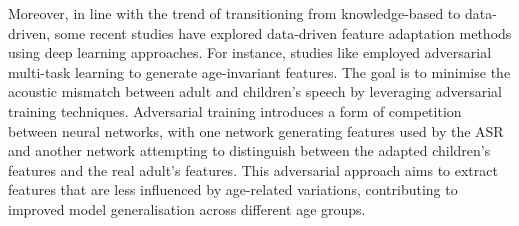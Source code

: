 
Moreover, in line with the trend of transitioning from knowledge-based to data-driven, some recent studies have explored data-driven feature adaptation methods using deep learning approaches. For instance, studies like \cite{adversarial-adapt1,adversarial-adapt2} employed adversarial multi-task learning to generate age-invariant features. The goal is to minimise the acoustic mismatch between adult and children's speech by leveraging adversarial training techniques. Adversarial training introduces a form of competition between neural networks, with one network generating features used by the ASR and another network attempting to distinguish between the adapted children's features and the real adult's features. This adversarial approach aims to extract features that are less influenced by age-related variations, contributing to improved model generalisation across different age groups.

